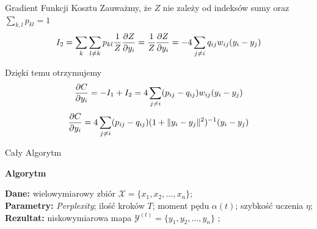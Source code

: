 \documentclass{beamer}
\begin{document}
	\begin{frame}{Gradient Funkcji Kosztu}
		Zauważmy, że $Z$ nie zależy od indeksów sumy oraz $\sum_{k, l} p_{kl} = 1$
		\begin{equation*}
			I_2 = \sum_{k}\sum_{l\neq k} p_{kl} \frac{1}{Z} \pdv{Z}{y_i} = \frac{1}{Z} \pdv{Z}{y_i} = -4\sum_{j\neq i} q_{ij} w_{ij}(y_i - y_j)
		\end{equation*}
		
		Dzięki temu otrzymujemy
		\begin{equation*}
			\pdv{C}{y_i} = -I_1 + I_2 = 4\sum_{j\neq i}(p_{ij} - q_{ij}) w_{ij} (y_i - y_j)
		\end{equation*}
		\begin{equation*}
			\pdv{C}{y_i} = 4\sum_{j\neq i} (p_{ij}-q_{ij})(1+\|y_i - y_j\|^2)^{-1}(y_i - y_j)
		\end{equation*}
	\end{frame}
	
	\begin{frame}{Cały Algorytm}
		\begin{center}
			\Large \textbf{Algorytm}
		\end{center}
		
		\textbf{Dane:} wielowymiarowy zbiór $\mathcal{X} = \{x_1, x_2, \ldots, x_n\}$;\\
		\textbf{Parametry:} \textit{Perplexity}; ilość kroków $T$; moment pędu $\alpha(t)$; szybkość uczenia $\eta$;\\
		\textbf{Rezultat:} niskowymiarowa mapa $\mathcal{Y}^{(t)} = \{y_1, y_2, \ldots, y_n\}$ ;
		
		\begin{algorithm}[H]
			
		\end{algorithm}
		
	\end{frame}
\end{document}
